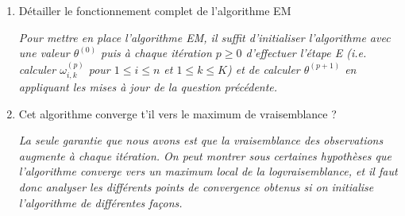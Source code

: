 \documentclass[a4paper,10pt,fleqn]{article}
\newcommand{\1}{\ensuremath{\mathbbm{1}}}
\begin{document}
\begin{enumerate}
\begin{enumerate}
\vspace{.2cm}

{\em Il est ais\'e de montrer que la fonction $\theta \mapsto Q(\theta;\theta^{(p)}) $ admet un maximum unique, obtenu en r\'esolvant l'\'equation $\nabla_\theta Q(\theta;\theta^{(p)}) = 0$. Pour tout $1\leq k \leq K$,
$$
\partial_{\lambda_k}Q(\theta;\theta^{(p)}) = \sum_{i=1}^n\omega_{i,k}^{(p)}(X_i) \left\{ - 1+ \frac{X_i}{\lambda_k}\right\}\,.
$$
On en d\'eduit que
$$
\lambda^{(p+1)}_k = \frac{\sum_{i=1}^n\omega_{i,k}^{(p)}(X_i)X_i}{\sum_{i=1}^n\omega_{i,k}^{(p)}(X_i)}\,.
$$
Par ailleurs, pour tout $1\leq k \leq K-1$, en utilisant que $\pi_K = 1 - \sum_{j=1}^{K-1}\pi_j$,
$$
\partial_{\pi_k}Q(\theta;\theta^{(p)}) = \sum_{i=1}^n \left\{\frac{\omega_{i,k}^{(p)}(X_i)}{\pi_k} - \frac{\omega_{i,K}^{(p)}(X_i)}{\pi_K}\right\}
$$
et on en d\'eduit que $k\mapsto\sum_{i=1}^n\omega_{i,k}^{(p)}(X_i)/\pi_k$ est constante. En utilisant par ailleurs que  $\sum_{k=1}^{K}\pi_k = 1$ et $\sum_{k=1}^{K}\omega_{i,k}^{(p)}(X_i)= 1$, on a
$$
\pi_k^{(p+1)} = \frac{1}{n}\sum_{i=1}^n\omega_{i,k}^{(p)}(X_i)\,.
$$} 
\item D\'etailler le fonctionnement complet de l'algorithme EM

\vspace{.2cm}

{\em Pour mettre en place l'algorithme EM, il suffit d'initialiser l'algorithme avec une valeur $\theta^{(0)}$ puis \`a chaque it\'eration $p\geq 0$ d'effectuer l'\'etape E (i.e. calculer $\omega_{i,k}^{(p)}$ pour $1\leq i \leq n$ et $1\leq k \leq K$) et de calculer $\theta^{(p+1)}$ en appliquant les mises \`a jour de la question pr\'ec\'edente.}
\item Cet algorithme converge t'il vers le maximum de vraisemblance ?

\vspace{.2cm}

{\em La seule garantie que nous avons est que la vraisemblance des observations augmente \`a chaque it\'eration. On peut montrer sous certaines hypoth\`eses que  l'algorithme converge vers un maximum local de la logvraisemblance, et il faut donc analyser les diff\'erents points de convergence obtenus si on initialise l'algorithme de diff\'erentes fa\c cons. }
\end{enumerate}
\end{enumerate}
\end{document}
